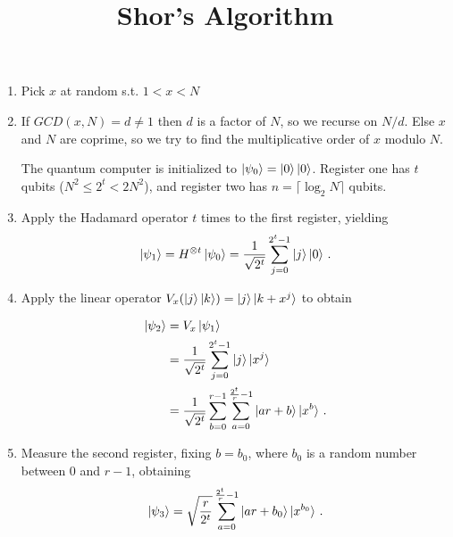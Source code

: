\documentclass{article}
\title{Shor's Algorithm}
\date{}
\begin{document}
\maketitle


\begin{enumerate}
\item Pick $x$ at random s.t. $1<x<N$

\item If $GCD(x,N) = d \neq 1$ then $d$ is a factor of $N$, so we recurse on $N/d$.
Else $x$ and $N$ are coprime, so we try to find the multiplicative order of $x$
modulo $N$.

The quantum computer is initialized to $\ket{\psi_0} = \ket{0}\ket{0}$.
Register one has $t$ qubits ($N^2 \leq 2^t < 2N^2$), and register two has $n =
\lceil{\log _2 N}\rceil$ qubits.

\item Apply the Hadamard operator $t$ times to the first register, yielding
  \begin{equation}
    \ket{\psi_1} = H^{\otimes{t}}\ket{\psi_0}
    = \frac{1}{\sqrt{2^t}}\sum_{j=0}^{2^t-1}\ket{j}\ket{0}
    \,.
  \end{equation}

\item Apply the linear operator $V_x(\ket{j}\ket{k}) = \ket{j}\ket{k+x^j}$ to obtain 

  \begin{equation}
    \begin{aligned}
      \ket{\psi_2} &= V_x\ket{\psi_1}\\
      &= \frac{1}{\sqrt{2^t}}\sum_{j=0}^{2^{t}-1}\ket{j}\ket{x^j}\\
      &= \frac{1}{\sqrt{2^t}}\sum_{b=0}^{r-1}\sum_{a=0}^{\frac{2^t}{r}-1}\ket{ar + b}\ket{x^b}
      \,.
    \end{aligned}
  \end{equation}

\item Measure the second register, fixing $b = b_0$, where $b_0$ is a random
  number between $0$ and $r-1$, obtaining
  \begin{equation}
    \ket{\psi_3}
    = \sqrt{\frac{r}{2^t}}\sum_{a=0}^{\frac{2^t}{r}-1}\ket{ar +
      b_0}\ket{x^{b_0}}
    \,.
  \end{equation}


\end{enumerate}
\end{document}
